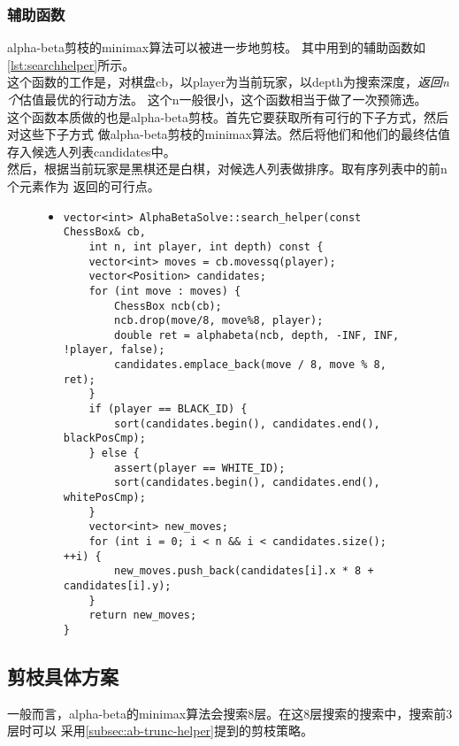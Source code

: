 \documentclass[a4paper]{article}
\begin{document}
\subsubsection{辅助函数}\label{subsec:ab-trunc-helper}
alpha-beta剪枝的minimax算法可以被进一步地剪枝。
其中用到的辅助函数如\autoref{lst:searchhelper}所示。\\

这个函数的工作是，对棋盘cb，以player为当前玩家，以depth为搜索深度，\emph{返回n个}估值最优的行动方法。
这个n一般很小，这个函数相当于做了一次预筛选。\\

这个函数本质做的也是alpha-beta剪枝。首先它要获取所有可行的下子方式，然后对这些下子方式
做alpha-beta剪枝的minimax算法。然后将他们和他们的最终估值存入候选人列表candidates中。\\

然后，根据当前玩家是黑棋还是白棋，对候选人列表做排序。取有序列表中的前n个元素作为
返回的可行点。\\

\begin{figure}[!hbt]
\begin{itemize}
\item[] \begin{lstlisting}[style=mycpp, label=lst:searchhelper, caption=行动方案预筛选函数]
vector<int> AlphaBetaSolve::search_helper(const ChessBox& cb, 
    int n, int player, int depth) const {
    vector<int> moves = cb.movessq(player);
    vector<Position> candidates;
    for (int move : moves) {
        ChessBox ncb(cb);
        ncb.drop(move/8, move%8, player);
        double ret = alphabeta(ncb, depth, -INF, INF, !player, false);
        candidates.emplace_back(move / 8, move % 8, ret);
    }
    if (player == BLACK_ID) {
        sort(candidates.begin(), candidates.end(), blackPosCmp);
    } else {
        assert(player == WHITE_ID);
        sort(candidates.begin(), candidates.end(), whitePosCmp);
    }
    vector<int> new_moves;
    for (int i = 0; i < n && i < candidates.size(); ++i) {
        new_moves.push_back(candidates[i].x * 8 + candidates[i].y);
    }
    return new_moves;
}
\end{lstlisting}
\end{itemize}
\end{figure}

\subsection{剪枝具体方案}
一般而言，alpha-beta的minimax算法会搜索8层。在这8层搜索的搜索中，搜索前3层时可以
采用\autoref{subsec:ab-trunc-helper}提到的剪枝策略。\\
\end{document}
